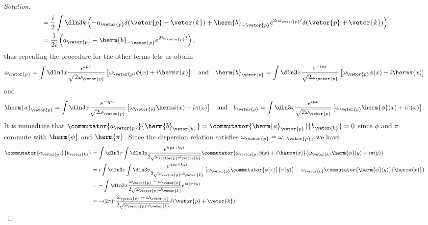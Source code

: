 \begin{proof}[Solution]
\begin{align*}
                                                     &= \frac{i}2\int \dln3k \left(-a_{\vetor{p}} \delta(\vetor{p} - \vetor{k}) + \herm{b}_{-\vetor{p}} e^{2i \omega_{\vetor{p}}t}\delta(\vetor{p} + \vetor{k})\right)\\
                                                     &= \frac{1}{2i} \left(a_{\vetor{p}} - \herm{b}_{-\vetor{p}}e^{2i \omega_{\vetor{p}}t} \right),
   \end{align*}
   thus repeating the procedure for the other terms lets us obtain
   \begin{equation*}
      a_{\vetor{p}} = \int\dln3x \frac{e^{ipx}}{\sqrt{2\omega_{\vetor{p}}}} \left[\omega_{\vetor{p}} \phi(x) + i \herm\pi(x)\right]
      \quad\text{and}\quad
      \herm{b}_{\vetor{p}} = \int\dln3x \frac{e^{-ipx}}{\sqrt{2\omega_{\vetor{p}}}} \left[\omega_{\vetor{p}} \phi(x) - i \herm\pi(x)\right]
   \end{equation*}
   and
   \begin{equation*}
      \herm{a}_{\vetor{p}} = \int\dln3x \frac{e^{-ipx}}{\sqrt{2\omega_{\vetor{p}}}} \left[\omega_{\vetor{p}} \herm\phi(x) - i \pi(x)\right]
      \quad\text{and}\quad
      b_{\vetor{p}} = \int\dln3x \frac{e^{ipx}}{\sqrt{2\omega_{\vetor{p}}}} \left[\omega_{\vetor{p}} \herm{\phi}(x) + i {\pi}(x)\right].
   \end{equation*}
   It is immediate that \(\commutator{a_{\vetor{p}}}{\herm{b}_{\vetor{k}}} = \commutator{\herm{a}_{\vetor{p}}}{b_{\vetor{k}}} = 0\) since \(\phi\) and \(\pi\) commute with \(\herm{\phi}\) and \(\herm{\pi}\). Since the dispersion relation satisfies \(\omega_{\vetor{p}} = \omega_{-\vetor{p}}\), we have
   \begin{align*}
      \commutator{a_{\vetor{p}}}{b_{\vetor{k}}} &= \int \dln3{x} \int \dln3{y} \frac{e^{i(px + k y)}}{2\sqrt{\omega_{\vetor{p}}\omega_{\vetor{k}}}} \commutator{\omega_{\vetor{p}} \phi(x) + i \herm\pi(x)}{\omega_{\vetor{k}} \herm{\phi}(y) + i \pi(y)}\\
                                                &= i\int \dln3x \int \dln3{y} \frac{e^{i(px + k y)}}{2 \sqrt{\omega_{\vetor{p}} \omega_{\vetor{k}}}} \left(\omega_{\vetor{p}}\commutator{\phi(x)}{\pi(y)} - \omega_{\vetor{k}} \commutator{\herm{\phi}(y)}{\herm\pi(x)} \right)\\
                                                &= - \int \dln3x \frac{\omega_{\vetor{p}} - \omega_{\vetor{k}}}{2 \sqrt{\omega_{\vetor{p}} \omega_{\vetor{k}}}} e^{ix(p + k)}\\
                                                &= -(2\pi)^3 \frac{\omega_{\vetor{p}} - \omega_{\vetor{k}}}{2\sqrt{\omega_{\vetor{p}} \omega_{\vetor{k}}}} \delta(\vetor{p} + \vetor{k})\\

\end{align*}
\end{proof}
